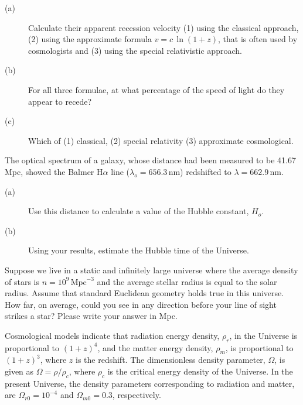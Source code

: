 \begin{description}
\item[(a)] Calculate their apparent recession velocity (1) using the classical
  approach, (2) using the approximate formula $v = c\,\ln(1+z)$, that is often
  used by cosmologists and (3) using the special relativistic approach.
\item[(b)] For all three formulae, at what percentage of the speed of light do
  they appear to recede?
\item[(c)] Which of (1) classical, (2) special relativity (3) approximate
  cosmological.
\end{description}

The optical spectrum of a galaxy, whose distance had been measured to be
41.67\,Mpc, showed the Balmer H$\alpha$ line ($\lambda_o = 656.3$\,nm)
redshifted to $\lambda = 662.9$\,nm.
\begin{description}
\item[(a)] Use this distance to calculate a value of the Hubble constant,
  $H_o$.
\item[(b)] Using your results, estimate the Hubble time of the Universe.
\end{description}

Suppose we live in a static and infinitely large universe where the average
density of stars is $n = 10^{9}\,\mathrm{Mpc}^{-3}$ and the average stellar
radius is equal to the solar radius. Assume that standard Euclidean geometry
holds true in this universe. How far, on average, could you see in any
direction before your line of sight strikes a star? Please write your answer
in Mpc.

Cosmological models indicate that radiation energy density, $\rho_r$, in the
Universe is proportional to $(1+z)^4$, and the matter energy density,
$\rho_m$, is proportional to $(1+z)^3$, where $z$ is the redshift. The
dimensionless density parameter, $\Omega$, is given as $\Omega = \rho/\rho_c$,
where $\rho_c$ is the critical energy density of the Universe. In the present
Universe, the density parameters corresponding to radiation and matter, are
$\Omega_{r0} = 10^{-4}$ and $\Omega_{m0} = 0.3$, respectively.

